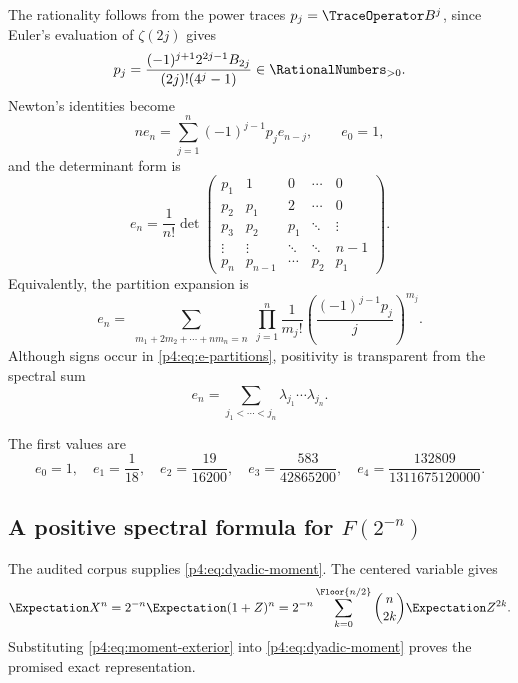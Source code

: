 \documentclass[11pt]{article}
\theoremstyle{definition}
\theoremstyle{remark}
\begin{document}
The rationality follows from the power traces
\(p_j=\TraceOperator B^j\), since Euler's evaluation of \(\zeta(2j)\) gives
\begin{equation}
 p_j=\frac{(-1)^{j+1}2^{2j-1}B_{2j}}
 {(2j)!(4^j-1)}\in\RationalNumbers_{>0}.
 \label{p4:eq:p-Bernoulli}
\end{equation}
Newton's identities become
\begin{equation}
 ne_n=\sum_{j=1}^{n}(-1)^{j-1}p_j e_{n-j},
 \qquad e_0=1,
 \label{p4:eq:Newton-e}
\end{equation}
and the determinant form is
\begin{equation}
 e_n=\frac1{n!}
 \det\begin{pmatrix}
 p_1&1&0&\cdots&0\\
 p_2&p_1&2&\cdots&0\\
 p_3&p_2&p_1&\ddots&\vdots\\
 \vdots&\vdots&\ddots&\ddots&n-1\\
 p_n&p_{n-1}&\cdots&p_2&p_1
 \end{pmatrix}.
 \label{p4:eq:e-determinant}
\end{equation}
Equivalently, the partition expansion is
\begin{equation}
 e_n=\sum_{\substack{m_1+2m_2+\cdots+nm_n=n}}
 \prod_{j=1}^{n}
 \frac1{m_j!}\left(\frac{(-1)^{j-1}p_j}{j}\right)^{m_j}.
 \label{p4:eq:e-partitions}
\end{equation}
Although signs occur in \eqref{p4:eq:e-partitions}, positivity is transparent from the
spectral sum
\begin{equation}
 e_n=\sum_{j_1<\cdots<j_n}\lambda_{j_1}\cdots\lambda_{j_n}.
 \label{p4:eq:e-spectral-sum}
\end{equation}

The first values are
\begin{equation}
 e_0=1,
 \quad e_1=\frac1{18},
 \quad e_2=\frac{19}{16200},
 \quad e_3=\frac{583}{42865200},
 \quad e_4=\frac{132809}{1311675120000}.
 \label{p4:eq:first-e}
\end{equation}

\subsection[A positive spectral formula for F at inverse powers of two]{A positive spectral formula for \(F(2^{-n})\)}

The audited corpus supplies \eqref{p4:eq:dyadic-moment}.  The centered variable gives
\begin{equation}
 \Expectation X^n=2^{-n}\Expectation(1+Z)^n
 =2^{-n}\sum_{k=0}^{\Floor{n/2}}
 \binom n{2k}\Expectation Z^{2k}.
 \label{p4:eq:X-centered-moment}
\end{equation}
Substituting \eqref{p4:eq:moment-exterior} into
\eqref{p4:eq:dyadic-moment} proves the promised exact representation.
\end{document}
